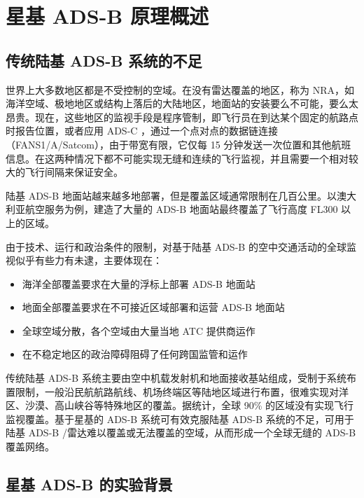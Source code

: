 
\chapter{星基 ADS-B 原理概述}

\section{传统陆基 ADS-B 系统的不足}

世界上大多数地区都是不受控制的空域。在没有雷达覆盖的地区，称为 \acs{NRA}，如海洋空域、极地地区或结构上落后的大陆地区，地面站的安装要么不可能，要么太昂贵。现在，这些地区的监视手段是程序管制，即飞行员在到达某个固定的航路点时报告位置，或者应用 ADS-C ，通过一个点对点的数据链连接（FANS1/A/Satcom），由于带宽有限，它仅每 15 分钟发送一次位置和其他航班信息。在这两种情况下都不可能实现无缝和连续的飞行监视，并且需要一个相对较大的飞行间隔来保证安全。

陆基 ADS-B 地面站越来越多地部署，但是覆盖区域通常限制在几百公里。以澳大利亚航空服务为例，建造了大量的 ADS-B 地面站最终覆盖了飞行高度 FL300 以上的区域。

由于技术、运行和政治条件的限制，对基于陆基 ADS-B 的空中交通活动的全球监视似乎有些力有未逮，主要体现在：

\begin{itemize}
    \item 海洋全部覆盖要求在大量的浮标上部署 ADS-B 地面站
    \item 地面全部覆盖要求在不可接近区域部署和运营 ADS-B 地面站
    \item 全球空域分散，各个空域由大量当地 ATC 提供商运作
    \item 在不稳定地区的政治障碍阻碍了任何跨国监管和运作
\end{itemize}

传统陆基 ADS-B 系统主要由空中机载发射机和地面接收基站组成，受制于系统布置限制，一般沿民航航路航线、机场终端区等陆地区域进行布置，很难实现对洋区、沙漠、高山峡谷等特殊地区的覆盖。据统计，全球 90\% 的区域没有实现飞行监视覆盖。基于星基的 ADS-B 系统可有效克服陆基 ADS-B 系统的不足，可用于陆基 ADS-B /雷达难以覆盖或无法覆盖的空域，从而形成一个全球无缝的 ADS-B 覆盖网络。

\section{星基 ADS-B 的实验背景}
\label{sec:space_based_ads-b_experiment_back}

